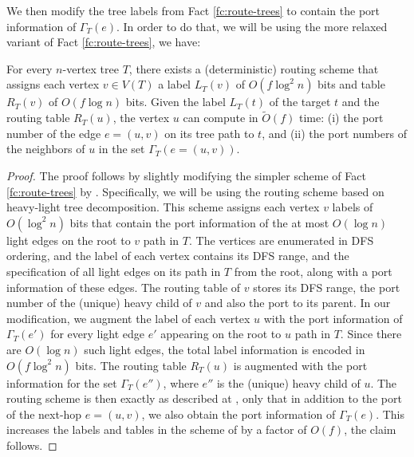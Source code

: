 We then modify the tree labels from Fact \ref{fc:route-trees} to contain the port information of $\Gamma_T(e)$. 
In order to do that, we will be using the more relaxed variant of Fact \ref{fc:route-trees}, we have:
\begin{claim}\label{cl:route-trees-port}
For every $n$-vertex tree $T$, there exists a (deterministic) routing scheme that assigns each vertex $v \in V(T)$ a label $L_T(v)$ of $O(f\log^2 n)$ bits and table $R_T(v)$ of $O(f\log n)$ bits. Given the label $L_T(t)$ of the target $t$  
and the routing table $R_T(u)$, the vertex $u$ can compute in $\widetilde{O}(f)$ time: (i) the port number of the edge $e=(u,v)$ on its tree path to $t$, and (ii) the port numbers of the neighbors of $u$ in the set $\Gamma_T(e=(u,v))$. 
\end{claim}
\begin{proof}
The proof follows by slightly modifying the simpler scheme of Fact \ref{fc:route-trees} by \cite{thorup2001compact}. Specifically, we will be using the routing scheme based on heavy-light tree decomposition. This scheme assigns each vertex $v$ labels of $O(\log^2 n)$ bits that contain the port information of the at most $O(\log n)$ light edges on the root to $v$ path in $T$.  The vertices are enumerated in DFS ordering, and the label of each vertex  contains its DFS range, and the specification of all light edges on its path in $T$ from the root, along with a port information of these edges.  The routing table of $v$ stores its DFS range, the port number of the (unique) heavy child of $v$ and also the port to its parent. In our modification, we augment the label of each vertex $u$ with the port information of $\Gamma_T(e')$ for every light edge $e'$ appearing on the root to $u$ path in $T$. Since there are $O(\log n)$ such light edges, the total label information is encoded in $O(f\log^2 n)$ bits. The routing table $R_T(u)$ is augmented with the port information for the set $\Gamma_T(e'')$, where $e''$ is the (unique) heavy child of $u$.  The routing scheme is then exactly as described at \cite{thorup2001compact}, only that in addition to the port of the next-hop $e=(u,v)$, we also obtain the port information of $\Gamma_T(e)$. This increases the labels and tables in the scheme of \cite{thorup2001compact} by a factor of $O(f)$, the claim follows.  
\end{proof}

